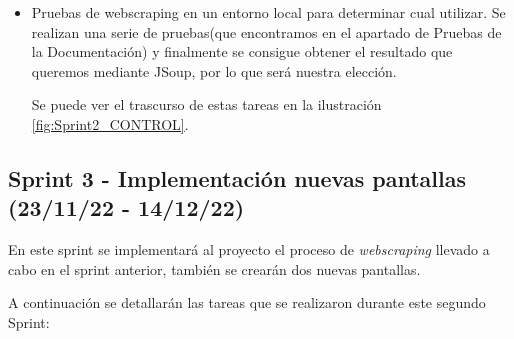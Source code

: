 \begin{itemize}
	\item Pruebas de webscraping en un entorno local para determinar cual utilizar. Se realizan una serie de pruebas(que encontramos en el apartado de Pruebas de la Documentación) y finalmente se consigue obtener el resultado que queremos mediante JSoup, por lo que será nuestra elección.
	
	Se puede ver el trascurso de estas tareas en la ilustración \ref{fig:Sprint2_CONTROL}.
	
\end{itemize}

\subsection{Sprint 3 - Implementación nuevas pantallas (23/11/22 - 14/12/22)}
En este sprint se implementará  al proyecto el proceso de \emph{webscraping} llevado a cabo en el sprint anterior, también se crearán dos nuevas pantallas.

A continuación se detallarán las tareas que se realizaron durante este segundo Sprint:

